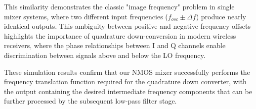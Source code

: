 This similarity demonstrates the classic "image frequency" problem in single mixer systems, where two different input frequencies ($f_{osc} \pm \Delta f$) produce nearly identical outputs. This ambiguity between positive and negative frequency offsets highlights the importance of quadrature down-conversion in modern wireless receivers, where the phase relationships between I and Q channels enable discrimination between signals above and below the LO frequency.

These simulation results confirm that our NMOS mixer successfully performs the frequency translation function required for the quadrature down converter, with the output containing the desired intermediate frequency components that can be further processed by the subsequent low-pass filter stage.
